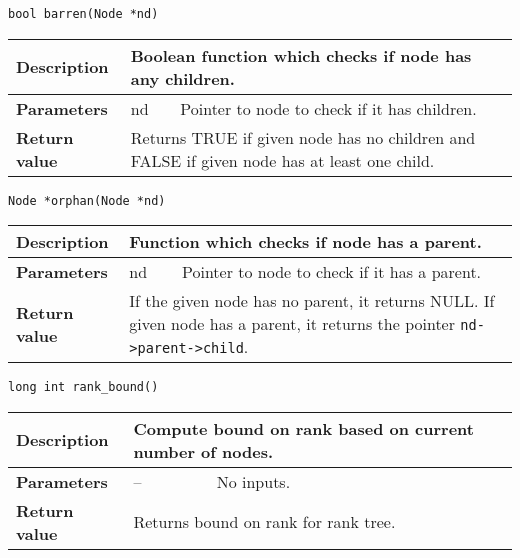 \documentclass[12pt, reqno]{amsart}
\begin{document}
{\large \texttt{bool barren(Node *nd)}}
\begin{center}
    \begin{tabular}{| l | p{2.5cm} | p{9.5cm} |}
    \hline
    {\bfseries Description} & \multicolumn{2}{p{12.5cm}|}{Boolean function which checks if node has any children.} \\ \hline
    \multirow{1}{*}{\bfseries Parameters} & nd & Pointer to node to check if it has children. \\ \hline
    {\bfseries Return value} & \multicolumn{2}{p{12.5cm}|}{Returns TRUE if given node has no children and FALSE if given node has at least one child.} \\ \hline
    \end{tabular}
\end{center}    
\vspace{3mm}   

{\large \texttt{Node *orphan(Node *nd)}}
\begin{center}
    \begin{tabular}{| l | p{2.5cm} | p{9.5cm} |}
    \hline
    {\bfseries Description} & \multicolumn{2}{p{12.5cm}|}{Function which checks if node has a parent.} \\ \hline
    \multirow{1}{*}{\bfseries Parameters} & nd & Pointer to node to check if it has a parent. \\ \hline
    {\bfseries Return value} & \multicolumn{2}{p{12.5cm}|}{If the given node has no parent, it returns NULL. If given node has a parent, it returns the pointer \texttt{nd->parent->child}.} \\ \hline
    \end{tabular}
\end{center}    
\vspace{3mm}   

{\large \texttt{long int rank\_bound()}}
\begin{center}
    \begin{tabular}{| l | p{2.5cm} | p{9.5cm} |}
    \hline
    {\bfseries Description} & \multicolumn{2}{p{12.5cm}|}{Compute bound on rank based on current number of nodes.} \\ \hline
    \multirow{1}{*}{\bfseries Parameters} & -- & No inputs. \\ \hline
    {\bfseries Return value} & \multicolumn{2}{p{12.5cm}|}{Returns bound on rank for rank tree.} \\ \hline
    \end{tabular}
\end{center}    
\vspace{3mm}   
\end{document}

